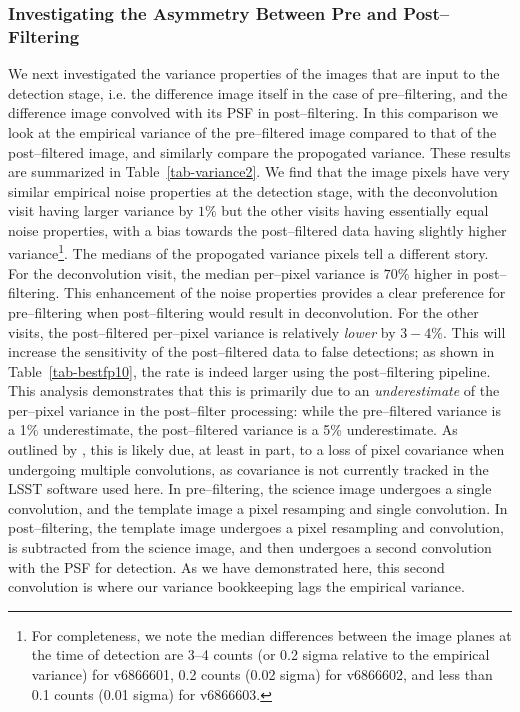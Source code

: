 \documentclass[iop]{emulateapj}
\begin{document}
\subsubsection{Investigating the Asymmetry Between Pre and Post--Filtering}

We next investigated the variance properties of the images that are input to the detection stage, i.e. the difference image itself in the case of pre--filtering, and the difference image convolved with its PSF in post--filtering.
In this comparison we look at the empirical variance of the pre--filtered image compared to that of the post--filtered image, and similarly compare the propogated variance.
These results are summarized in Table~\ref{tab-variance2}.
We find that the image pixels have very similar empirical noise properties at the detection stage, with the deconvolution visit having larger variance by $1\%$ but the other visits having essentially equal noise properties, with a bias towards the post--filtered data having slightly higher variance\footnote{For completeness, we note the median differences between the image planes at the time of detection are 3--4 counts (or 0.2 sigma relative to the empirical variance) for v6866601, 0.2 counts (0.02 sigma) for v6866602, and less than 0.1 counts (0.01 sigma) for v6866603.}.
The medians of the propogated variance pixels tell a different story.
For the deconvolution visit, the median per--pixel variance is $70\%$ higher in post--filtering.
This enhancement of the noise properties provides a clear preference for pre--filtering when post--filtering would result in deconvolution.
For the other visits, the post--filtered per--pixel variance is relatively {\it lower} by $3-4\%$.
This will increase the sensitivity of the post--filtered data to false detections; as shown in Table~\ref{tab-bestfp10}, the rate is indeed larger using the post--filtering pipeline.
This analysis demonstrates that this is primarily due to an {\it underestimate} of the per--pixel variance in the post--filter processing: while the pre--filtered variance is a 1\% underestimate, the post--filtered variance is a 5\% underestimate.
As outlined by \cite{Price-Stacking}, this is likely due, at least in part, to a loss of pixel covariance when undergoing multiple convolutions, as covariance is not currently tracked in the LSST software used here.
In pre--filtering, the science image undergoes a single convolution, and the template image a pixel resamping and single convolution.
In post--filtering, the template image undergoes a pixel resampling and convolution, is subtracted from the science image, and then undergoes a second convolution with the PSF for detection.
As we have demonstrated here, this second convolution is where our variance bookkeeping lags the empirical variance.
\end{document}
